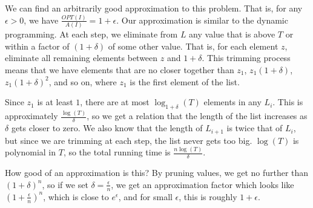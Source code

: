 \documentclass[twoside]{article}
\begin{document}
We can find an arbitrarily good approximation to this problem.  That is, for any $\epsilon>0$, we have $\frac{OPT(I)}{A(I)}=1+\epsilon$.  Our approximation is similar to the dynamic programming.  At each step, we eliminate from $L$ any value that is above $T$ or within a factor of $(1+\delta)$ of some other value.  That is, for each element $z$, eliminate all remaining elements between $z$ and $1+\delta$.  This trimming process means that we have elements that are no closer together than $z_1$, $z_1(1+\delta)$, $z_1(1+\delta)^2$, and so on, where $z_1$ is the first element of the list.

Since $z_1$ is at least $1$, there are at most $\log_{1+\delta}(T)$ elements in any $L_i$.  This is approximately $\frac{\log(T)}{\delta}$, so we get a relation that the length of the list increases as $\delta$ gets closer to zero.  We also know that the length of $L_{i+1}$ is twice that of $L_i$, but since we are trimming at each step, the list never gets too big.  $\log(T)$ is polynomial in $T$, so the total running time is $\frac{n\log(T)}{\delta}$.

How good of an approximation is this?  By pruning values, we get no further than $(1+\delta)^n$, so if we set $\delta=\frac{\epsilon}{n}$, we get an approximation factor which looks like $(1+\frac{\epsilon}{n})^n$, which is close to $e^\epsilon$, and for small $\epsilon$, this is roughly $1+\epsilon$.
\end{document}

